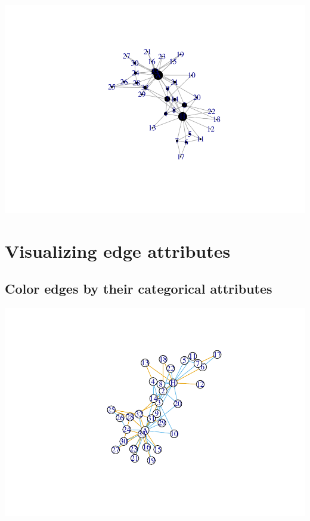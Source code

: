 \documentclass[
]{book}
\newenvironment{Shaded}{\begin{snugshade}}{\end{snugshade}}
\newcommand{\AttributeTok}[1]{\textcolor[rgb]{0.13,0.29,0.53}{#1}}
\newcommand{\CommentTok}[1]{\textcolor[rgb]{0.56,0.35,0.01}{\textit{#1}}}
\newcommand{\FunctionTok}[1]{\textcolor[rgb]{0.13,0.29,0.53}{\textbf{#1}}}
\newcommand{\NormalTok}[1]{#1}
\newcommand{\SpecialCharTok}[1]{\textcolor[rgb]{0.81,0.36,0.00}{\textbf{#1}}}
\newcommand{\StringTok}[1]{\textcolor[rgb]{0.31,0.60,0.02}{#1}}
\begin{document}
\includegraphics{bookdown-demo_files/figure-latex/unnamed-chunk-131-1.pdf}

\section{Visualizing edge attributes}\label{visualizing-edge-attributes}

\subsection{Color edges by their categorical attributes}\label{color-edges-by-their-categorical-attributes}

\begin{Shaded}
\end{Shaded}

\includegraphics{bookdown-demo_files/figure-latex/unnamed-chunk-132-1.pdf}
\end{document}
